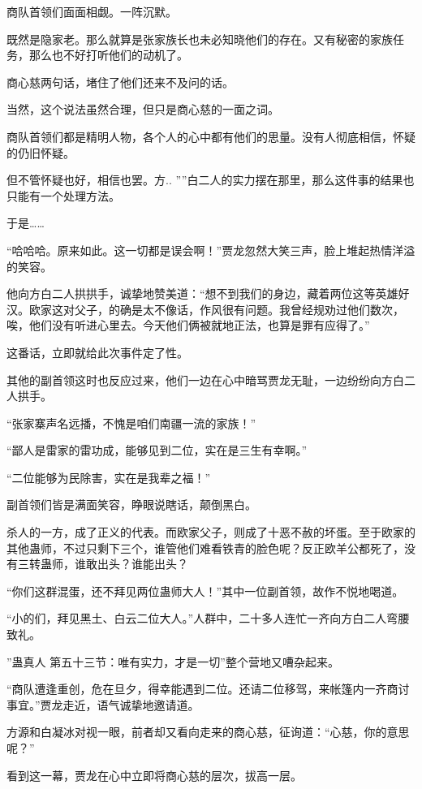 \begin{this_body}
商队首领们面面相觑。一阵沉默。

既然是隐家老。那么就算是张家族长也未必知晓他们的存在。又有秘密的家族任务，那么也不好打听他们的动机了。

商心慈两句话，堵住了他们还来不及问的话。

当然，这个说法虽然合理，但只是商心慈的一面之词。

商队首领们都是精明人物，各个人的心中都有他们的思量。没有人彻底相信，怀疑的仍旧怀疑。

但不管怀疑也好，相信也罢。方.. ””白二人的实力摆在那里，那么这件事的结果也只能有一个处理方法。

于是……

“哈哈哈。原来如此。这一切都是误会啊！”贾龙忽然大笑三声，脸上堆起热情洋溢的笑容。

他向方白二人拱拱手，诚挚地赞美道：“想不到我们的身边，藏着两位这等英雄好汉。欧家这对父子，的确是太不像话，作风很有问题。我曾经规劝过他们数次，唉，他们没有听进心里去。今天他们俩被就地正法，也算是罪有应得了。”

这番话，立即就给此次事件定了性。

其他的副首领这时也反应过来，他们一边在心中暗骂贾龙无耻，一边纷纷向方白二人拱手。

“张家寨声名远播，不愧是咱们南疆一流的家族！”

“鄙人是雷家的雷功成，能够见到二位，实在是三生有幸啊。”

“二位能够为民除害，实在是我辈之福！”

副首领们皆是满面笑容，睁眼说瞎话，颠倒黑白。

杀人的一方，成了正义的代表。而欧家父子，则成了十恶不赦的坏蛋。至于欧家的其他蛊师，不过只剩下三个，谁管他们难看铁青的脸色呢？反正欧羊公都死了，没有三转蛊师，谁敢出头？谁能出头？

“你们这群混蛋，还不拜见两位蛊师大人！”其中一位副首领，故作不悦地喝道。

“小的们，拜见黑土、白云二位大人。”人群中，二十多人连忙一齐向方白二人弯腰致礼。

”蛊真人 第五十三节：唯有实力，才是一切”整个营地又嘈杂起来。

“商队遭逢重创，危在旦夕，得幸能遇到二位。还请二位移驾，来帐篷内一齐商讨事宜。”贾龙走近，语气诚挚地邀请道。

方源和白凝冰对视一眼，前者却又看向走来的商心慈，征询道：“心慈，你的意思呢？”

看到这一幕，贾龙在心中立即将商心慈的层次，拔高一层。


\end{this_body}
